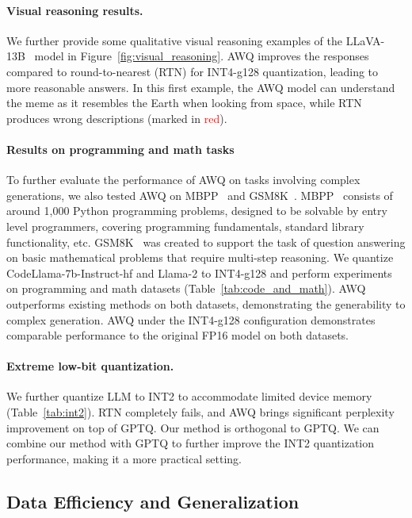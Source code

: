 \paragraph{Visual reasoning results.} We further provide some qualitative visual reasoning examples of the LLaVA-13B~\cite{liu2023llava} model in Figure~\ref{fig:visual_reasoning}. AWQ improves the responses compared to round-to-nearest (RTN) for INT4-g128 quantization, leading to more reasonable answers. In this first example, the AWQ model can understand the meme as it resembles the Earth when looking from space, while RTN produces wrong descriptions (marked in \textcolor{red}{red}). 

\paragraph{Results on programming and math tasks} To further evaluate the performance of AWQ on tasks involving complex generations, we also tested AWQ on MBPP~\cite{austin2021program} and GSM8K~\cite{cobbe2021training}. MBPP~\cite{austin2021program} consists of around 1,000 Python programming problems, designed to be solvable by entry level programmers, covering programming fundamentals, standard library functionality, etc. GSM8K~\cite{cobbe2021training} was created to support the task of question answering on basic mathematical problems that require multi-step reasoning. We quantize CodeLlama-7b-Instruct-hf and Llama-2 to INT4-g128 and perform experiments on programming and math datasets (Table~\ref{tab:code_and_math}). AWQ outperforms existing methods on both datasets, demonstrating the generability to complex generation. AWQ under the INT4-g128 configuration demonstrates comparable performance to the original FP16 model on both datasets.

\paragraph{Extreme low-bit quantization.} We further quantize LLM to INT2 to accommodate limited device memory (Table~\ref{tab:int2}). RTN completely fails, and AWQ brings significant perplexity improvement on top of GPTQ. Our method is orthogonal to GPTQ. We can combine our method with GPTQ to further improve the INT2 quantization performance, making it a more practical setting. 

\subsection{Data Efficiency and Generalization}
\label{sec:ablation_study}
